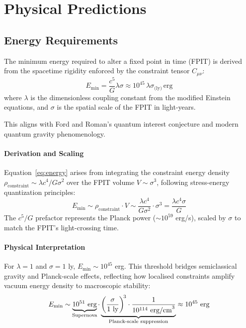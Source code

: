 \documentclass[twocolumn]{article}
\begin{document}
	\FloatBarrier%
	\section{Physical Predictions}\label{sec:predictions}
	
	\subsection{Energy Requirements}\label{subsec:energy}
	
	The minimum energy required to alter a fixed point in time (FPIT) is derived from the spacetime rigidity enforced by the constraint tensor \(C_{\mu\nu}\):
	\begin{equation}
		E_{\text{min}} = \frac{c^5}{G} \lambda \sigma \approx 10^{45} \, \lambda \sigma_{\text{(ly)}} \, \text{erg}
\label{eq:energy}
	\end{equation}
	where \(\lambda\) is the dimensionless coupling constant from the modified Einstein equations, and \(\sigma\) is the spatial scale of the FPIT in light-years.
	
	This aligns with Ford and Roman's quantum interest conjecture\cite{FordRoman1996} and modern quantum gravity phenomenology\cite{Addazi2022}.
	
	\paragraph{Derivation and Scaling}
	Equation~\eqref{eq:energy} arises from integrating the constraint energy density \(\rho_{\text{constraint}} \sim \lambda c^4 / G \sigma^2\) over the FPIT volume \(V \sim \sigma^3\), following stress-energy quantization principles\cite{FordRoman1996}:
	\begin{equation}
		E_{\text{min}} \sim \rho_{\text{constraint}} \cdot V \sim \frac{\lambda c^4}{G \sigma^2} \cdot \sigma^3 = \frac{\lambda c^4 \sigma}{G}
	\end{equation}
	The \(c^5/G\) prefactor represents the Planck power (\({\sim}10^{59}\) erg/s), scaled by \(\sigma\) to match the FPIT’s light-crossing time.
	
	\paragraph{Physical Interpretation}
	For \(\lambda = 1\) and \(\sigma = 1\) ly, \(E_{\text{min}} \sim 10^{45}\) erg. This threshold bridges semiclassical gravity and Planck-scale effects, reflecting how localised constraints amplify vacuum energy density to macroscopic stability:
	\begin{equation}
		E_{\text{min}} \sim \underbrace{10^{51}~\text{erg}}_{\mathclap{\text{Supernova}}} \cdot \underbrace{\left(\frac{\sigma}{1~\text{ly}}\right)^{\!3} \cdot \frac{1}{10^{114}~\text{erg/cm}^3}}_{\mathclap{\text{Planck-scale suppression}}} \approx 10^{45}~\text{erg}
	\end{equation}
	
\end{document}
